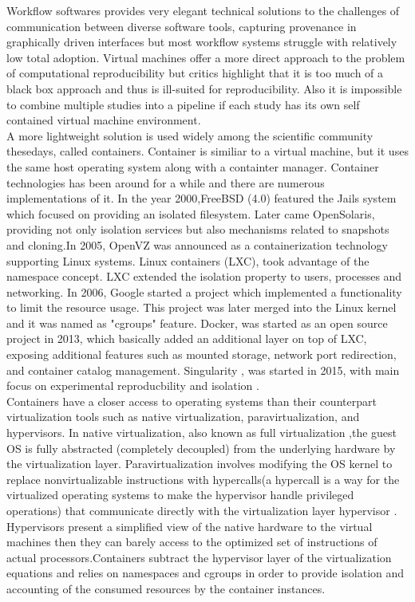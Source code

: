 Workflow softwares provides very elegant technical solutions to the challenges of communication between diverse software tools, capturing provenance in graphically driven interfaces but most workflow systems struggle with relatively low total adoption. Virtual machines offer a more direct approach to the problem of computational reproducibility but critics highlight that it is too much of a black box approach and thus is ill-suited for reproducibility. Also it is impossible to combine multiple studies into a pipeline if each study has its own self contained virtual machine environment\cite{Boettiger:2015:IDR:2723872.2723882}.\\

A more lightweight solution is used widely among the scientific community thesedays, called containers. Container is similiar to a virtual machine, but it uses the same host operating system along with a containter manager. Container technologies has been around for a while and there are numerous implementations of it. In the year 2000,FreeBSD (4.0) featured the Jails system which focused on providing an isolated filesystem. Later came OpenSolaris, providing not only isolation services but also mechanisms related to snapshots and cloning.In 2005, OpenVZ was announced as a containerization technology supporting Linux systems. Linux containers (LXC), took advantage of the namespace concept. LXC extended the isolation property to users, processes and networking. In 2006, Google started a project which implemented a functionality to limit the resource usage. This project was later merged into the Linux kernel and it was named as "cgroups" feature. Docker, was started as an open source project in 2013, which basically added an additional layer on top of LXC, exposing additional features such as mounted storage, network port redirection, and container catalog management. Singularity , was started in 2015, with main focus on experimental reproducbility and isolation \cite{Xavier:2013:PEC:2497369.2497577}.\\ 

Containers have a closer access to operating systems than their counterpart virtualization tools such as native virtualization, paravirtualization, and hypervisors. In native virtualization, also known as full virtualization ,the guest OS is fully abstracted (completely decoupled) from the underlying hardware by the virtualization layer. Paravirtualization involves modifying the OS kernel to replace nonvirtualizable instructions with hypercalls(a hypercall is a way for the virtualized operating systems to make the hypervisor handle privileged operations) that communicate directly with the virtualization layer hypervisor \cite{citeulike:11530382}. Hypervisors present a simplified view of the native hardware to the virtual machines then they can barely access to the optimized set of instructions of actual processors.Containers subtract the hypervisor layer of the virtualization equations and relies on namespaces and cgroups in order to provide isolation and accounting of the consumed resources by the container instances.\\

